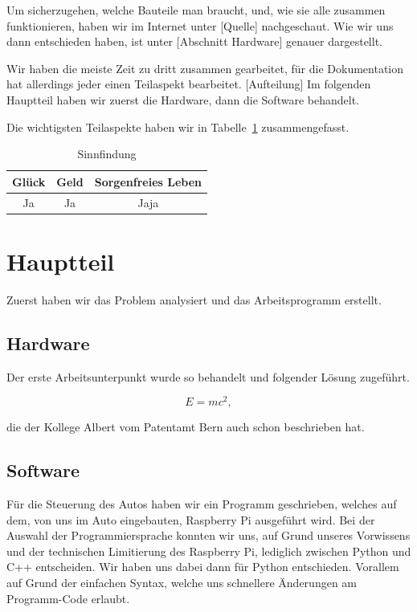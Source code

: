 \documentclass[a4paper,12pt]{article}
\begin{document}
Um sicherzugehen, welche Bauteile man braucht, und, wie sie alle zusammen funktionieren, haben wir im Internet unter [Quelle] nachgeschaut.
Wie wir uns dann entschieden haben, ist unter [Abschnitt Hardware] genauer dargestellt.

Wir haben die meiste Zeit zu dritt zusammen gearbeitet, f\"ur die Dokumentation hat allerdings jeder einen Teilaspekt bearbeitet.
[Aufteilung]
Im folgenden Hauptteil haben wir zuerst die Hardware, dann die Software behandelt.

Die wichtigsten Teilaspekte haben wir in Tabelle~\ref{Tab1} zusammengefasst.

\begin{table}[h]
	\centering
	\begin{tabular}{|c|c|c|}
	\hline
		Gl\"uck & Geld  & Sorgenfreies Leben  \\ \hline
		Ja  & Ja & Jaja \\ \hline
	\end{tabular}
	\caption{Sinnfindung}
	\label{Tab1}
\end{table}


\section{Hauptteil}\label{sec2}

Zuerst haben wir das Problem analysiert und das Arbeitsprogramm erstellt.

\subsection{Hardware}\label{sec2.1}

Der erste Arbeitsunterpunkt wurde so behandelt und folgender L\"osung zugef\"uhrt.

\begin{equation}
	E = mc^2 ,
\end{equation}

die der Kollege Albert vom Patentamt Bern  \cite{Alb05} auch schon beschrieben hat.

\subsection{Software}\label{sec2.2}

F\"ur die Steuerung des Autos haben wir ein Programm geschrieben, welches auf dem, von uns im Auto eingebauten, Raspberry Pi ausgef\"uhrt wird.
Bei der Auswahl der Programmiersprache konnten wir uns, auf Grund unseres Vorwissens und der technischen Limitierung des Raspberry Pi, lediglich zwischen Python und C++ entscheiden. Wir haben uns dabei dann f\"ur Python entschieden.
Vorallem auf Grund der einfachen Syntax, welche uns schnellere \"Anderungen am Programm-Code erlaubt.
\end{document}
